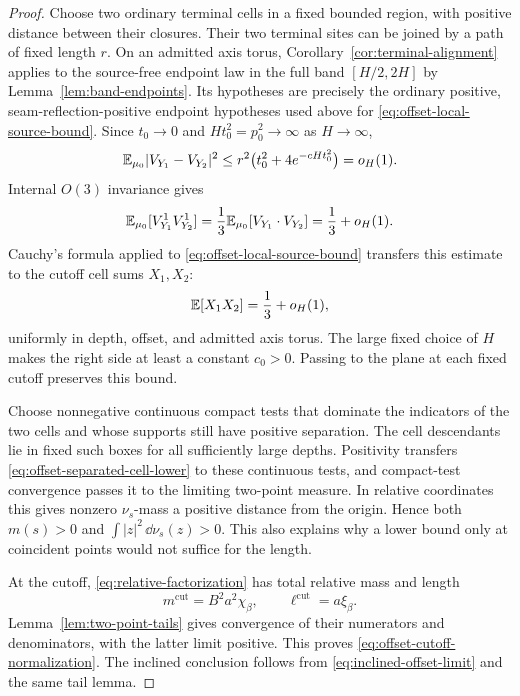 \begin{proof}
Choose two ordinary terminal cells in a fixed bounded region, with
positive distance between their closures.  Their two terminal sites
can be joined by a path of fixed length $r$.  On an admitted axis torus,
Corollary~\ref{cor:terminal-alignment} applies to the source-free
endpoint law in the full band $[H/2,2H]$ by
Lemma~\ref{lem:band-endpoints}.  Its hypotheses are precisely
the ordinary positive, seam-reflection-positive endpoint hypotheses
used above for \eqref{eq:offset-local-source-bound}.  Since
$t_0\to0$ and $Ht_0^2=p_0^2\to\infty$ as $H\to\infty$,
\[
 \mathbb E_{\mu_0}|V_{Y_1}-V_{Y_2}|^2
 \le r^2\bigl(t_0^2+4e^{-cHt_0^2}\bigr)=o_H(1).
\]
Internal $O(3)$ invariance gives
\[
 \mathbb E_{\mu_0}[V_{Y_1}^1V_{Y_2}^1]
   =\frac13\mathbb E_{\mu_0}[V_{Y_1}\cdot V_{Y_2}]
   =\frac13+o_H(1).
\]
Cauchy's formula applied to
\eqref{eq:offset-local-source-bound} transfers this estimate to the
cutoff cell sums $X_1,X_2$:
\begin{equation}
 \mathbb E[X_1X_2]=\frac13+o_H(1),
 \label{eq:offset-separated-cell-lower}
\end{equation}
uniformly in depth, offset, and admitted axis torus.  The large fixed
choice of $H$ makes the right side at least a constant $c_0>0$.
Passing to the plane at each fixed cutoff preserves this bound.

Choose nonnegative continuous compact tests that dominate the indicators
of the two cells and whose supports still have positive separation.
The cell descendants lie in fixed such boxes for all sufficiently large
depths.  Positivity transfers \eqref{eq:offset-separated-cell-lower}
to these continuous tests, and compact-test convergence passes it to
the limiting two-point measure.  In relative coordinates this gives
nonzero $\nu_s$-mass a positive distance from the origin.  Hence both
$m(s)>0$ and $\int|z|^2\,\dd\nu_s(z)>0$.  This also explains why a
lower bound only at coincident points would not suffice for the length.

At the cutoff, \eqref{eq:relative-factorization} has total relative
mass and length
\begin{equation}
 m^{\mathrm{cut}}=B^2a^2\chi_\beta,\qquad
 \ell^{\mathrm{cut}}=a\xi_\beta.
 \label{eq:cutoff-mass-length-identity}
\end{equation}
Lemma~\ref{lem:two-point-tails} gives convergence of their numerators
and denominators, with the latter limit positive.  This proves
\eqref{eq:offset-cutoff-normalization}.  The inclined conclusion follows
from \eqref{eq:inclined-offset-limit} and the same tail lemma.


\end{proof}

